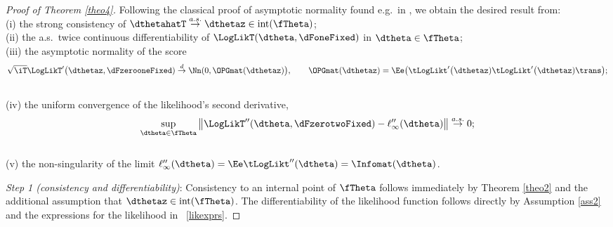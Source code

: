 \proofskip
\begin{proof}[Proof of Theorem \ref{theo4}]
Following the classical proof of asymptotic normality found e.g.~in
\citet[Theorem 6.2]{RePEc:cup:cbooks:9780521252805}, 
we obtain the desired result from:
\\(i) the strong consistency of $\dthetahatT \stackrel{a.s.}{\to} \dthetaz \in \mathrm{int}(\fTheta)$;
\\(ii) the a.s.~twice continuous differentiability of $\LogLikT(\dtheta,\dFoneFixed)$ in $\dtheta \in \fTheta$;
\\(iii) the asymptotic normality of the score
\begin{equation}
    \label{eqanscoref1}
    \sqrt{\iT}\LogLikT'\big(\dthetaz,\dFzerooneFixed) \stackrel{d}{\to} 
    \Nn(0,\OPGmat(\dthetaz)\big), \qquad
    \OPGmat(\dthetaz) = \Ee\big(\tLogLikt'\big(\dthetaz) \tLogLikt'\big(\dthetaz)\trans \big);
\end{equation}
\\(iv)  the uniform convergence of the likelihood's second derivative,
\begin{equation}
    \label{equcinf}
\sup_{\dtheta \in \fTheta} \big\| \LogLikT''(\dtheta,\dFzerotwoFixed) - \ell_{\infty}''(\dtheta)  \big\| \stackrel{a.s.}{\to} 0;
\end{equation}
\\(v)  the non-singularity of the limit $\ell_{\infty}''(\dtheta) = \Ee\tLogLikt''(\dtheta) = \Infomat(\dtheta)$. 

\textit{Step 1 (consistency and differentiability)}:
Consistency to an internal point of $\fTheta$ follows immediately by Theorem \ref{theo2} and the additional assumption that $\dthetaz \in \mathrm{int}(\fTheta)$. The differentiability of the likelihood function follows directly by Assumption \ref{ass2} and the expressions for the likelihood in \SupplementaryAppendix\ \ref{likexprs}. 


\end{proof}
